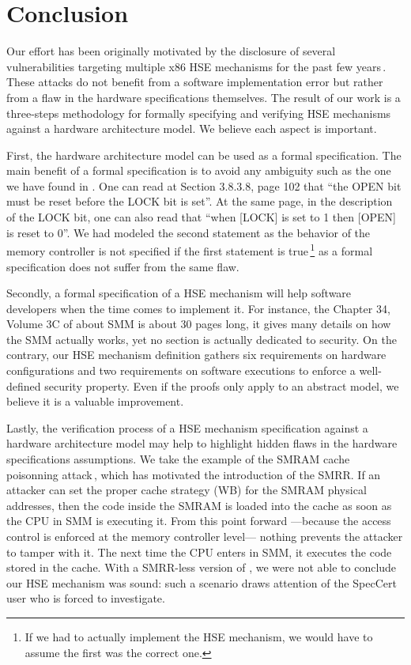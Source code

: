 \section{Conclusion} \label{sec:speccert:discuss}

Our effort has been originally motivated by the disclosure of several
vulnerabilities targeting multiple x86 HSE mechanisms for the past few
years\,\cite{wojtczuk2009smram,duflot2009smram,rutkowska2008remap,domas2015sinkhole,kallenberg2015racecondition}. These
attacks do not benefit from a software implementation error but rather from a
flaw in the hardware specifications themselves. The result of our work is a
three-steps methodology for formally specifying and verifying HSE mechanisms
against a hardware architecture model. We believe each aspect is important.

First, the hardware architecture model can be used as a formal specification.
The main benefit of a formal specification is to avoid any ambiguity such as the
one we have found in \cite{intel2009mch}. One can read at Section 3.8.3.8, page
102 that “the OPEN bit must be reset before the LOCK bit is set”.  At the same
page, in the description of the LOCK bit, one can also read that “when [LOCK] is
set to 1 then [OPEN] is reset to 0”. We had modeled the second statement as the
behavior of the memory controller is not specified if the first statement is
true\,\footnote{If we had to actually implement the HSE mechanism, we would have
  to assume the first was the correct one.}   as a formal
specification does not suffer from the same flaw.

Secondly, a formal specification of a HSE mechanism will help software
developers when the time comes to implement it. For instance, the Chapter 34,
Volume 3C of \cite{intel2014manual} about SMM is about 30 pages long, it gives
many details on how the SMM actually works, yet no section is actually dedicated
to security. On the contrary, our HSE mechanism definition gathers six
requirements on hardware configurations and two requirements on software
executions to enforce a well-defined security property. Even if the proofs only
apply to an abstract model, we believe it is a valuable improvement.

Lastly, the verification process of a HSE mechanism specification against a
hardware architecture model may help to highlight hidden flaws in the hardware
specifications assumptions. We take the example of the SMRAM cache poisonning
attack\,\cite{wojtczuk2009smram,duflot2009smram}, which has motivated the
introduction of the SMRR. If an attacker can set the proper cache strategy (WB)
for the SMRAM physical addresses, then the code inside the SMRAM is loaded into
the cache as soon as the CPU in SMM is executing it. From this point forward
---because the access control is enforced at the memory controller level---
nothing prevents the attacker to tamper with it. The next time the CPU enters in
SMM, it executes the code stored in the cache. With a SMRR-less version of
, we were not able to conclude our HSE mechanism was sound:
such a scenario draws attention of the SpecCert user who is forced to
investigate.

